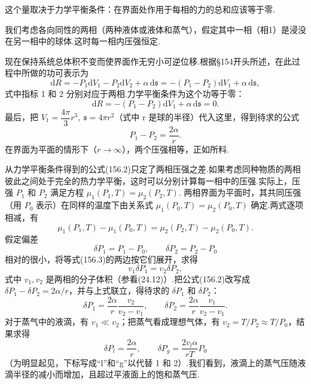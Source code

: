 这个量取决于力学平衡条件：在界面处作用于每相的力的总和应该等于零.

我们考虑各向同性的两相（两种液体或液体和蒸气），假定其中一相（相1）是浸没在另一相中的球体.这时每一相内压强恒定.

现在保持系统总体积不变而使界面作无穷小可逆位移.根据§154开头所述，在此过程中所做的功可表示为
\begin{equation}
  \mathrm{d}R=-P_1\mathrm{d}V_1-P_2\mathrm{d}V_2+\alpha\,\mathrm{d}\mathfrak{s}
  =-(P_1-P_2)\mathrm{d}V_1+\alpha\,\mathrm{d}\mathfrak{s},
\end{equation}
式中指标 1 和 2 分别对应于两相.力学平衡条件为这个功等于零：
\begin{equation*}
  \mathrm{d}R=-(P_1-P_2)\mathrm{d}V_1+\alpha\,\mathrm{d}\mathfrak{s}=0.
\end{equation*}
最后，把 $V_1=\dfrac{4\pi}{3}r^3,\ \mathfrak{s}=4\pi r^2$（式中 r 是球的半径）代入这里，得到待求的公式
\begin{equation}
  P_1-P_2=\frac{2\alpha}{r}.
\end{equation}
在界面为平面的情形下（$r\to\infty$），两个压强相等，正如所料.

从力学平衡条件得到的公式(156.2)只定了两相压强之差.如果考虑同种物质的两相彼此之间处于完全的热力学平衡，这时可以分别计算每一相中的压强.实际上，压强 $P_1$ 和 $P_2$ 满足方程 $\mu_1(P_1,T)=\mu_2(P_2,T)$. 两相界面为平面时，其共同压强（用 $P_0$ 表示）在同样的温度下由关系式 $\mu_1(P_0,T)=\mu_2(P_0,T)$ 确定.两式逐项相减，有
\begin{equation}
  \mu_1(P_1,T)-\mu_1(P_0,T)=\mu_2(P_2,T)-\mu_2(P_0,T).
\end{equation}
假定偏差
\begin{equation*}
  \delta P_1=P_1-P_0,\qquad \delta P_2=P_2-P_0
\end{equation*}
相对的很小，将等式(156.3)的两边按它们展开，求得
\begin{equation}
  v_1\delta P_1=v_2\delta P_2,
\end{equation}
式中 $v_1,v_2$ 是两相的分子体积（参看(24.12)）.把公式(156.2)改写成 $\delta P_1-\delta P_2=2\alpha/r$，并与上式联立，得待求的 $\delta P_1$ 和 $\delta P_2$：
\begin{equation}
  \delta P_1=\frac{2\alpha}{r}\frac{v_2}{v_2-v_1},\qquad
  \delta P_2=\frac{2\alpha}{r}\frac{v_1}{v_2-v_1}.
\end{equation}
对于蒸气中的液滴，有 $v_1\ll v_2$；把蒸气看成理想气体，有 $v_2=T/P_2\approx T/P_0$，结果求得
\begin{equation}
  \delta P_l=\frac{2\alpha}{r},\qquad
  \delta P_g=\frac{2v_l\alpha}{rT}P_0
\end{equation}
（为明显起见，下标写成“l”和“g”以代替 1 和 2）.我们看到，液滴上的蒸气压随液滴半径的减小而增加，且超过平液面上的饱和蒸气压.

